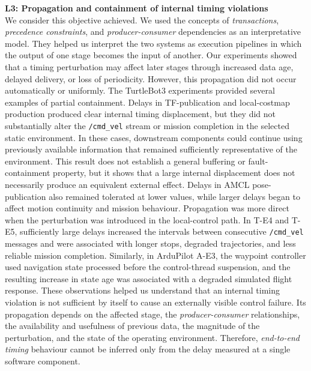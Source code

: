 \noindent\textbf{L3: Propagation and containment of internal timing violations} \\ %
We consider this objective achieved. We used the concepts of \textit{transactions},  \textit{precedence constraints}, and \textit{producer-consumer} dependencies as an interpretative model. They helped us interpret the two systems as execution pipelines in which the output of one stage becomes the input of another. Our experiments showed that a timing perturbation may affect later stages through increased data age, delayed delivery, or loss of periodicity. However, this propagation did not occur automatically or uniformly.
The TurtleBot3 experiments provided several examples of partial containment. Delays in TF-publication and local-costmap production produced clear internal timing displacement, but they did not substantially alter the \texttt{/cmd\_vel} stream or mission completion in the selected static environment. In these cases, downstream components could continue using previously available information that remained sufficiently representative of the environment. This result does not establish a general buffering or fault-containment property, but it shows that a large internal displacement does not necessarily produce an equivalent external effect. Delays in AMCL pose-publication also remained tolerated at lower values, while larger delays began to affect motion continuity and mission behaviour. Propagation was more direct when the perturbation was introduced in the local-control path. In T-E4 and T-E5, sufficiently large delays increased the intervals between consecutive \texttt{/cmd\_vel} messages and were associated with longer stops, degraded trajectories, and less reliable mission completion. 
Similarly, in ArduPilot A-E3, the waypoint controller used navigation state processed before the control-thread suspension, and the resulting increase in state age was associated with a degraded simulated flight response.
These observations helped us understand that an internal timing violation is not sufficient by itself to cause an externally visible control failure. Its propagation depends on the affected stage, the \textit{producer-consumer} relationships, the availability and usefulness of previous data, the magnitude of the perturbation, and the state of the operating environment. Therefore, \textit{end-to-end timing} behaviour cannot be inferred only from the delay measured at a single software component.

